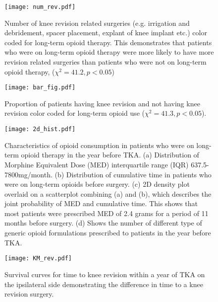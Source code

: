 \documentclass[a4paper]{article}
\begin{document}
\newpage
\begin{center}
\begin{figure}
        \texttt{[image: num\_rev.pdf]}
                \caption{Number of knee revision related surgeries (e.g. irrigation and debridement, spacer placement, explant of knee implant etc.) color coded for long-term opioid therapy. This demonstrates that patients who were on long-term opioid therapy were more likely to have more revision related surgeries than patients who were not on long-term opioid therapy, ($\chi^2 = 41.2, p<0.05$)}
\end{figure}		
\end{center}
\newpage
\begin{center}
\begin{figure}
\texttt{[image: bar\_fig.pdf]}

\caption{Proportion of patients having knee revision and not having knee revision color coded for long-term opioid use ($\chi^2 = 41.3, p<0.05$). }
\end{figure}
\end{center}
\newpage
\begin{center}
\begin{figure}
\texttt{[image: 2d\_hist.pdf]}

\caption{Characteristics of opioid consumption in patients who were on long-term opioid therapy in the year before TKA. (a) Distribution of Morphine Equivalent Dose (MED) interquartile range (IQR) 637.5-7800mg/month.  (b) Distribution of cumulative time in patients who were on long-term opioids before surgery.  (c) 2D density plot overlaid on a scatterplot combining (a) and
          (b), which describes the joint probability of MED and cumulative time.  This
          shows that most patients were prescribed MED of 2.4 grams for a period of
          11 months before surgery.  (d) Shows the number of different type of generic
          opioid formulations prescribed to patients in the year before TKA.}
\end{figure}
\end{center}
\newline

\begin{center}
	\begin{figure}
		\centering
			\texttt{[image: KM\_rev.pdf]} %
			\caption{Survival curves for time to knee revision within a year of TKA on the ipsilateral side demonstrating the difference in time to a knee revision surgery.}
	\end{figure}
\end{center}
\newline
\end{document}
